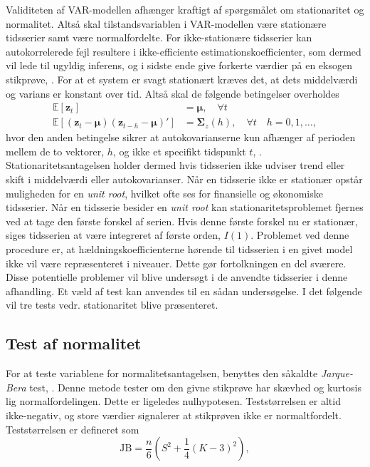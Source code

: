 \documentclass[
  a4paper,
  oneside]{memoir}
\begin{document}
Validiteten af VAR-modellen afhænger kraftigt af spørgsmålet om stationaritet og normalitet. Altså skal tilstandsvariablen i VAR-modellen være stationære tidsserier samt være normalfordelte. For ikke-stationære tidsserier kan autokorrelerede fejl resultere i ikke-efficiente estimationskoefficienter, som dermed vil lede til ugyldig inferens, og i sidste ende give forkerte værdier på en eksogen stikprøve, \citep{Granger1974}. For at et system er svagt stationært kræves det, at dets middelværdi og varians er konstant over tid. Altså skal de følgende betingelser overholdes
\begin{align*}
\mathbb{E}\left[\bm{z}_t\right]&=\bm{\mu},\quad\forall t\\
\mathbb{E}\left[(\bm{z}_t-\bm{\mu}) (\bm{z}_{t-h}-\bm{\mu})'\right]&=\bm{\Sigma}_z(h),\quad \forall t\quad h=0,1,\dots,
\end{align*}
hvor den anden betingelse sikrer at autokovarianserne kun afhænger af perioden mellem de to vektorer, \(h\), og ikke et specifikt tidspunkt \(t\), \citep{Lutkepohl2005}. Stationaritetsantagelsen holder dermed hvis tidsserien ikke udviser trend eller skift i middelværdi eller autokovarianser. Når en tidsserie ikke er stationær opstår muligheden for en \emph{unit root}, hvilket ofte ses for finansielle og økonomiske tidsserier. Når en tidsserie besider en \emph{unit root} kan stationaritetsproblemet fjernes ved at tage den første forskel af serien. Hvis denne første forskel nu er stationær, siges tidsserien at være integreret af første orden, \(I(1)\). Problemet ved denne procedure er, at hældningskoefficienterne hørende til tidsserien i en givet model ikke vil være repræsenteret i niveauer. Dette gør fortolkningen en del sværere. Disse potentielle problemer vil blive undersøgt i de anvendte tidsserier i denne afhandling. Et væld af test kan anvendes til en sådan undersøgelse. I det følgende vil tre tests vedr. stationaritet blive præsenteret.

\hypertarget{test-af-normalitet}{%
\subsection{Test af normalitet}\label{test-af-normalitet}}

For at teste variablene for normalitetsantagelsen, benyttes den såkaldte \emph{Jarque-Bera} test, \citep{Jarque1980}. Denne metode tester om den givne stikprøve har skævhed og kurtosis lig normalfordelingen. Dette er ligeledes nulhypotesen. Teststørrelsen er altid ikke-negativ, og store værdier signalerer at stikprøven ikke er normaltfordelt. Teststørrelsen er defineret som
\[\text{JB}=\frac{n}{6}\left(S^2+\frac{1}{4}(K-3)^2\right),\]
\end{document}
